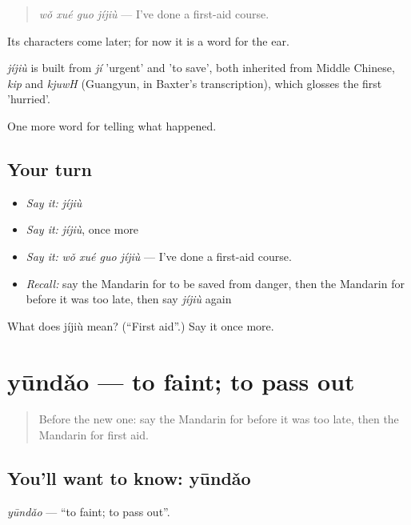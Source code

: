 \begin{quote}
\emph{wǒ xué guo jíjiù} — I've done a first-aid course.
\end{quote}

Its characters come later; for now it is a word for the ear.

\begin{cousinweb}
\emph{jíjiù} is built from \emph{jí} 'urgent' and  'to save', both inherited from Middle Chinese, \emph{kip} and \emph{kjuwH} (Guangyun, in Baxter's transcription), which glosses the first 'hurried'.
\end{cousinweb}

\begin{grammarlens}[title={What you've built}]
One more word for telling what happened.
\end{grammarlens}

\subsection*{Your turn}
\begin{itemize}
\raggedright
  \item \emph{Say it:} \emph{jíjiù}
  \item \emph{Say it:} \emph{jíjiù}, once more
  \item \emph{Say it:} \emph{wǒ xué guo jíjiù} — I've done a first-aid course.
  \item \emph{Recall:} say the Mandarin for to be saved from danger, then the Mandarin for before it was too late, then say \emph{jíjiù} again
\end{itemize}

\begin{tcolorbox}[breakable,colback=teal!4,colframe=teal!35!black,title={Before you move on}]
What does jíjiù mean? (\textquotedblleft{}First aid\textquotedblright{}.) Say it once more.
\end{tcolorbox}
\section[yūndǎo]{yūndǎo — to faint; to pass out}

\label{lesson:ZH-C299-yundao}



\begin{quote}
Before the new one: say the Mandarin for before it was too late, then the Mandarin for first aid.
\end{quote}

\subsection*{You'll want to know: yūndǎo}
\emph{yūndǎo} — \textquotedblleft{}to faint; to pass out\textquotedblright{}.

